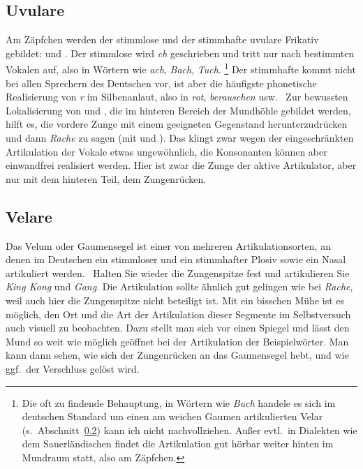 \subsection{Uvulare}

\label{sec:uvulare}


Am Zäpfchen werden der stimmlose und der stimmhafte uvulare Frikativ gebildet: \textipa{[X]} und \textipa{[K]}.
Der stimmlose wird \textit{ch} geschrieben und tritt nur nach bestimmten Vokalen auf, also in Wörtern wie \textit{ach}, \textit{Bach}, \textit{Tuch}.%
\footnote{Die oft zu findende Behauptung, in Wörtern wie \textit{Buch} handele es sich im deutschen Standard um einen am weichen Gaumen artikulierten Velar \textipa{[x]} (s.\ Abschnitt~\ref{sec:velare}) kann ich nicht nachvollziehen.
Außer evtl.\ in Dialekten wie dem Sauerländischen findet die Artikulation gut hörbar weiter hinten im Mundraum statt, also am Zäpfchen.
}
Der stimmhafte kommt nicht bei allen Sprechern des Deutschen vor, ist aber die häufigste phonetische Realisierung von \textit{r} im Silbenanlaut, also in \textit{rot}, \textit{berauschen} usw.
\TuBegin~Zur bewussten Lokalisierung von \textipa{[X]} und \textipa{[K]}, die im hinteren Bereich der Mundhöhle gebildet werden, hilft es, die vordere Zunge mit einem geeigneten Gegenstand herunterzudrücken und dann \zB \textit{Rache} zu sagen (mit \textipa{[K]} und \textipa{[X]}).
Das klingt zwar wegen der eingeschränkten Artikulation der Vokale etwas ungewöhnlich, die Konsonanten können aber einwandfrei realisiert werden.
Hier ist zwar die Zunge der aktive Artikulator, aber nur mit dem hinteren Teil, dem Zungenrücken.

\subsection{Velare}

\label{sec:velare}


Das Velum oder Gaumensegel ist einer von mehreren Artikulationsorten, an denen im Deutschen ein stimmloser und ein stimmhafter Plosiv sowie ein Nasal artikuliert werden.
\TuBegin~Halten Sie wieder die Zungenspitze fest und artikulieren Sie \textit{King Kong} und \textit{Gang}.
Die Artikulation sollte ähnlich gut gelingen wie bei \textit{Rache}, weil auch hier die Zungenspitze nicht beteiligt ist.
Mit ein bisschen Mühe ist es möglich, den Ort und die Art der Artikulation dieser Segmente im Selbstversuch auch visuell zu beobachten.
Dazu stellt man sich vor einen Spiegel und lässt den Mund so weit wie möglich geöffnet bei der Artikulation der Beispielwörter.
Man kann dann sehen, wie sich der Zungenrücken an das Gaumensegel hebt, und wie ggf.\ der Verschluss gelöst wird.

